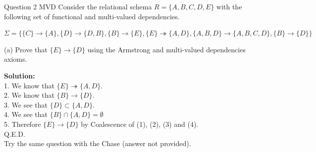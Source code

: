 \begin{frame}[fragile]{Question 2 MVD}
Consider the relational schema $R = \{A,B,C,D,E\}$ with the following set of functional and multi-valued dependencies.\\ \vspace{5pt}

$\Sigma=\{\{C\}\rightarrow\{A\}, \{D\}\rightarrow\{D,B\}, \{B\}\rightarrow\{E\},\{E\}\twoheadrightarrow\{A,D\},\{A,B,D\}\rightarrow\{A,B,C,D\},\{B\}\rightarrow\{D\}\}$\\ \vspace{5pt}

(a) Prove that $\{E\}\rightarrow\{D\}$ using the Armstrong and multi-valued dependencies axioms.\\ \vspace{5pt}

\textbf{Solution:}\\ \vspace{5pt}
1. We know that $\{E\}\twoheadrightarrow\{A,D\}$.\\ \vspace{2pt}
2. We know that $\{B\}\rightarrow\{D\}$.\\\vspace{2pt}
3. We see that $\{D\}\subset\{A,D\}$.\\\vspace{2pt}
4. We see that $\{B\}\cap \{A,D\}=\emptyset$\\\vspace{2pt}
5. Therefore $\{E\}\rightarrow\{D\}$ by Coalescence of (1), (2), (3) and (4).\\\vspace{2pt}
\hfill Q.E.D.\\\vspace{10pt}
Try the same question with the Chase (answer not provided).
\end{frame}

